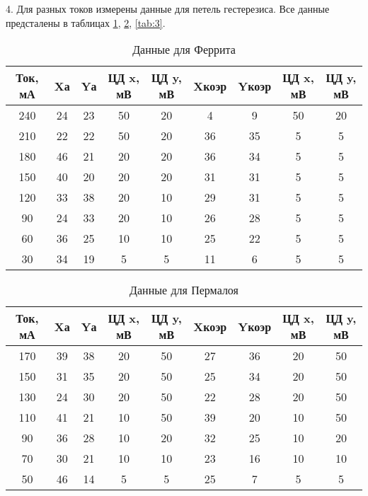 4. Для разных токов измерены данные для петель гестерезиса. Все данные предсталены в таблицах \ref{tab:1}, \ref{tab:2}, \ref{tab:3}.
\begin{table}
    \centering
    \begin{tabular}{|c|c|c|c|c|c|c|c|c|}
        \hline
        Ток, мА & Xа & Yа & ЦД x, мВ & ЦД y, мВ & Xкоэр & Yкоэр & ЦД x, мВ & ЦД y, мВ \\
		\hline
		240 & 24 & 23 & 50 & 20 & 4 & 9 & 50 & 20 \\
		\hline
		210 & 22 & 22 & 50 & 20 & 36 & 35 & 5 & 5 \\
		\hline
		180 & 46 & 21 & 20 & 20 & 36 & 34 & 5 & 5 \\
		\hline
		150 & 40 & 20 & 20 & 20 & 31 & 31 & 5 & 5 \\
		\hline
		120 & 33 & 38 & 20 & 10 & 29 & 31 & 5 & 5 \\
		\hline
		90 & 24 & 33 & 20 & 10 & 26 & 28 & 5 & 5 \\
		\hline
		60 & 36 & 25 & 10 & 10 & 25 & 22 & 5 & 5 \\
		\hline
		30 & 34 & 19 & 5 & 5 & 11 & 6 & 5 & 5 \\
		\hline
    \end{tabular}
    \caption{Данные для Феррита}
    \label{tab:1}
\end{table}

\begin{table}
    \centering
    \begin{tabular}{|c|c|c|c|c|c|c|c|c|}
        \hline
        Ток, мА & Xа & Yа & ЦД x, мВ & ЦД y, мВ & Xкоэр & Yкоэр & ЦД x, мВ & ЦД y, мВ \\
		\hline
		170 & 39 & 38 & 20 & 50 & 27 & 36 & 20 & 50 \\
		\hline
		150 & 31 & 35 & 20 & 50 & 25 & 34 & 20 & 50 \\
		\hline
		130 & 24 & 30 & 20 & 50 & 22 & 28 & 20 & 50 \\
		\hline
		110 & 41 & 21 & 10 & 50 & 39 & 20 & 10 & 50 \\
		\hline
		90 & 36 & 28 & 10 & 20 & 32 & 25 & 10 & 20 \\
		\hline
		70 & 30 & 21 & 10 & 10 & 23 & 16 & 10 & 10 \\
		\hline
		50 & 46 & 14 & 5 & 5 & 25 & 7 & 5 & 5 \\
		\hline
    \end{tabular}
    \caption{Данные для Пермалоя}
    \label{tab:2}
\end{table}

